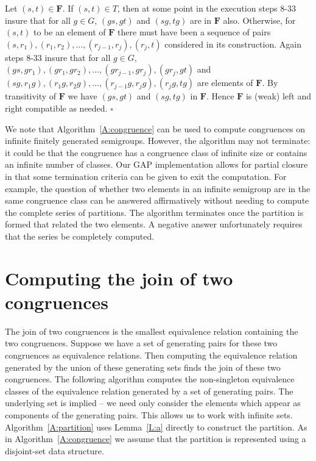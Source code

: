 \documentclass{acmconf}
\def\gap{\sf GAP}
\begin{document}
Let $(s,t)\in \mathbf F$. If $(s,t)\in T$, then at
some point in the execution steps 8-33
insure that for all $g\in G$,
$(gs,gt)$ and $(sg,tg)$ are in $\mathbf F$ also. 
Otherwise, for $(s,t)$ to be an element of $\mathbf F$
there must have been a sequence of pairs   
$(s,r_1),(r_1,r_2),\dots,(r_{j-1},r_j),(r_j,t)$
considered in its construction. Again steps 8-33
insure that for all $g\in G$, 
$(gs,gr_1),(gr_1,gr_2),\dots,(gr_{j-1},gr_j),(gr_j,gt)$ and 
$(sg,r_1g),(r_1g,r_2g),\dots,(r_{j-1}g,r_jg),(r_jg,tg)$ are elements
of $\mathbf F$. By transitivity of $\mathbf F$ we have
$(gs,gt)$ and $(sg,tg)$ in $\mathbf F$. Hence $\mathbf F$ is
(weak) left and right compatible as needed.
$\square$ 

We note that Algorithm~\ref{A:congruence} 
can be used to compute congruences on infinite finitely
generated semigroups. However, the algorithm may not terminate:
it could be that the congruence has a congruence class
of infinite size or contains 
an infinite number of classes. 
Our {\gap} implementation allows for partial closure in that 
some termination criteria can be given to exit the computation. For example,
the question of whether two elements in an infinite semigroup
are in the same congruence class 
can be answered affirmatively without needing to 
compute the complete series of partitions.
The algorithm terminates once the partition is formed that 
related the two elements.
A negative answer unfortunately requires that the series be 
completely computed. 

\section{Computing the join of two congruences} \label{S:join}
The join of two congruences is the smallest equivalence relation
containing the two congruences. Suppose we have a set of
generating pairs for these two congruences as equivalence relations.
Then computing the equivalence relation generated by the union of these
generating sets finds the join of these two congruences.
The following algorithm computes the non-singleton equivalence classes
of the  
equivalence relation generated by a set of generating pairs. The underlying
set is implied -- we need only consider the elements which appear as 
components of the generating pairs. This allows us to work with 
infinite sets.
Algorithm~\ref{A:partition} uses Lemma~\ref{L:a} directly to construct 
the partition. As in Algorithm~\ref{A:congruence} we assume that the
partition is represented using a disjoint-set data structure.
\end{document}
